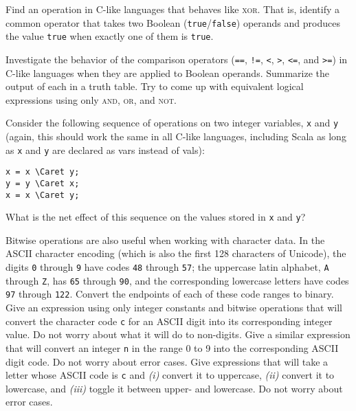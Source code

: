 \begin{exercises}
\problem Find an operation in C-like languages that behaves like \textsc{xor}. That is, identify a common operator that takes two Boolean (\verb|true|/\verb|false|) operands and produces the value \verb|true| when exactly one of them is \verb|true|.

\problem\label{ex:cmpop}Investigate the behavior of the comparison operators (\verb|==|, \verb|!=|, \verb|<|, \verb|>|, \verb|<=|, and \verb|>=|) in C-like languages when they are applied to Boolean operands. Summarize the output of each in a truth table. Try to come up with equivalent logical expressions using only \textsc{and}, \textsc{or}, and \textsc{not}.

\problem Consider the following sequence of operations on two integer variables, \verb|x| and \verb|y| (again, this should work the same in all C-like languages, including Scala as long as \verb|x| and \verb|y| are declared as vars instead of vals):
\begin{Verbatim}
x = x \Caret y;
y = y \Caret x;
x = x \Caret y;
\end{Verbatim}
What is the net effect of this sequence on the values stored in \verb|x| and \verb|y|?

\problem Bitwise operations are also useful when working with character data. In the ASCII character encoding (which is also the first 128 characters of Unicode), the digits \verb|0| through \verb|9| have codes \verb|48| through \verb|57|; the uppercase latin alphabet, \verb|A| through \verb|Z|, has \verb|65| through \verb|90|, and the corresponding lowercase letters have codes \verb|97| through \verb|122|.
\ppart Convert the endpoints of each of these code ranges to binary.
\ppart Give an expression using only integer constants and bitwise operations that will convert the character code \verb|c| for an ASCII digit into its corresponding integer value. Do not worry about what it will do to non-digits.
\ppart Give a similar expression that will convert an integer \verb|n| in the range 0 to 9 into the corresponding ASCII digit code. Do not worry about error cases.
\ppart Give expressions that will take a letter whose ASCII code is \verb|c| and \textit{(i)} convert it to uppercase, \textit{(ii)} convert it to lowercase, and \textit{(iii)} toggle it between upper- and lowercase. Do not worry about error cases.

\end{exercises}


